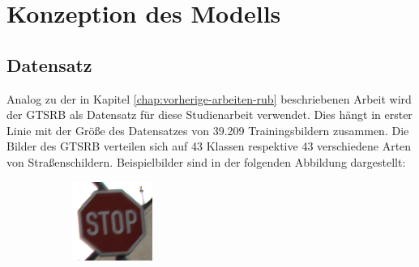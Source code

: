 \chapter{Konzeption des Modells}
\label{chap:konzept}
\section{Datensatz}
Analog zu der in Kapitel \ref{chap:vorherige-arbeiten-rub} beschriebenen Arbeit wird der \ac{GTSRB} als Datensatz für diese Studienarbeit verwendet. Dies hängt in erster Linie mit der Größe des Datensatzes von 39.209 Trainingsbildern zusammen. Die Bilder des \ac{GTSRB} verteilen sich auf 43 Klassen respektive 43 verschiedene Arten von Straßenschildern. Beispielbilder sind in der folgenden Abbildung dargestellt: \cite{GTSRB}


\begin{figure}[H]
   \centering
   \begin{subfigure}[b]{0.125\textwidth}
       \centering
       \includegraphics[height=\textwidth]{../images/GTSRB/00093.png}
       \caption{}
       \label{fig:gtrsb-paper-bsp-image-1}
   \end{subfigure}
   \hspace{3em}%
   \begin{subfigure}[b]{0.125\textwidth}
       \centering

\end{subfigure}
\end{figure}

